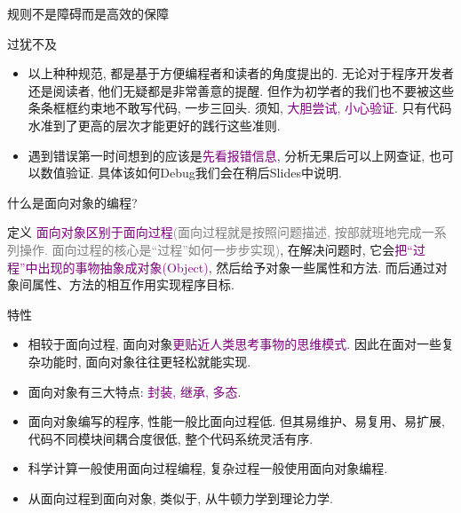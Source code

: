 \documentclass{beamer}
\newcommand{\purple}{\textcolor{purple}}
\begin{document}
    \begin{frame}{规则不是障碍而是高效的保障}
      \begin{block}{过犹不及}
        \begin{itemize}
          \item 以上种种规范, 都是基于方便编程者和读者的角度提出的. 无论对于程序开发者还是阅读者, 他们无疑都是非常善意的提醒. 但作为初学者的我们也不要被这些条条框框约束地不敢写代码, 一步三回头. 须知, \purple{大胆尝试, 小心验证}. 只有代码水准到了更高的层次才能更好的践行这些准则.
          \item 遇到错误第一时间想到的应该是\purple{先看报错信息}, 分析无果后可以上网查证, 也可以数值验证. 具体该如何Debug我们会在稍后Slides中说明.
        \end{itemize}
      \end{block}
    \end{frame}

    \begin{frame}{什么是面向对象的编程?}
      \begin{block}{定义}
        \purple{面向对象区别于面向过程}\textcolor{gray}{(面向过程就是按照问题描述, 按部就班地完成一系列操作. 面向过程的核心是``过程''如何一步步实现)}, 在解决问题时, 它会\purple{把``过程''中出现的事物抽象成对象(Object)}, 然后给予对象一些属性和方法. 而后通过对象间属性、方法的相互作用实现程序目标.
      \end{block}
      \begin{block}{特性}
        \begin{itemize}
          \item 相较于面向过程, 面向对象\purple{更贴近人类思考事物的思维模式}. 因此在面对一些复杂功能时, 面向对象往往更轻松就能实现.
          \item 面向对象有三大特点: \purple{封装, 继承, 多态}.
          \item 面向对象编写的程序, 性能一般比面向过程低. 但其易维护、易复用、易扩展, 代码不同模块间耦合度很低, 整个代码系统灵活有序.
          \item 科学计算一般使用面向过程编程, 复杂过程一般使用面向对象编程.
          \item 从面向过程到面向对象, 类似于, 从牛顿力学到理论力学.
        \end{itemize}
      \end{block}
    \end{frame}
\end{document}
